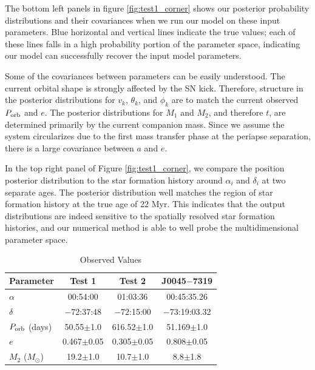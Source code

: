 \documentclass[12pt, preprint]{aastex}
\newcommand{\Msun}{\ifmmode {M_{\odot}}\else${M_{\odot}}$\fi}
\begin{document}
The bottom left panels in figure \ref{fig:test1_corner} shows our posterior probability distributions and their covariances when we run our model on these input parameters. Blue horizontal and vertical lines indicate the true values; each of these lines falls in a high probability portion of the parameter space, indicating our model can successfully recover the input model parameters. 

Some of the covariances between parameters can be easily understood. The current orbital shape is strongly affected by the SN kick. Therefore, structure in the posterior distributions for $v_k$, $\theta_k$, and $\phi_k$ are to match the current observed $P_{\rm orb}$ and $e$. The posterior distributions for $M_1$ and $M_2$, and therefore $t$, are determined primarily by the current companion mass. Since we assume the system circularizes due to the first mass transfer phase at the periapse separation, there is a large covariance between $a$ and $e$.

In the top right panel of Figure \ref{fig:test1_corner}, we compare the position posterior distribution to the star formation history around $\alpha_i$ and $\delta_i$ at two separate ages. The posterior distribution well matches the region of star formation history at the true age of 22 Myr. This indicates that the output distributions are indeed sensitive to the spatially resolved star formation histories, and our numerical method is able to well probe the multidimensional parameter space.

\begin{table}
\label{tab:observations}
\begin{center}
\caption{Observed Values}
\begin{tabular}{lccc} 
\toprule
Parameter & Test 1 & Test 2 & J0045$-$7319 \\
\midrule
$\alpha$ & 00:54:00 & 01:03:36 & 00:45:35.26 \\
$\delta$ & $-$72:37:48 & $-$72:15:00 & $-$73:19:03.32 \\
$P_{\rm orb}$ (days) & 50.55$\pm$1.0 & 616.52$\pm$1.0 & 51.169$\pm$1.0 \\
$e$ & 0.467$\pm$0.05 & 0.305$\pm$0.05 & 0.808$\pm$0.05 \\
$M_2$ (\Msun) & 19.2$\pm$1.0 & 10.7$\pm$1.0 & 8.8$\pm$1.8 \\
\bottomrule
\end{tabular}
\end{center}
\end{table}
\end{document}
